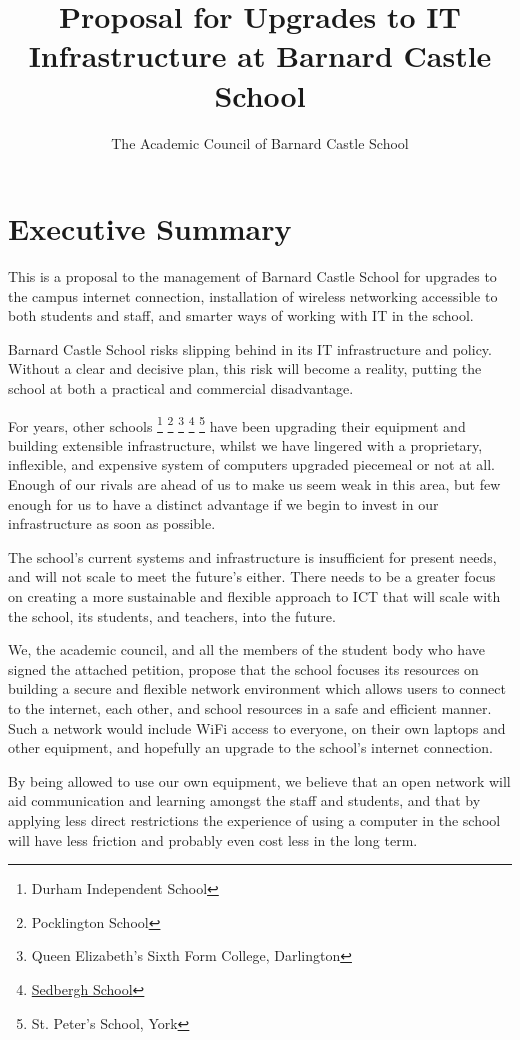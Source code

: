 \documentclass[a4paper,leqno,titlepage]{article}
\title{Proposal for Upgrades to IT Infrastructure at Barnard Castle School}
\author{The Academic Council of Barnard Castle School}
\begin{document}
\maketitle

\section{Executive Summary}

This is a proposal to the management of Barnard Castle School for upgrades
to the campus internet connection,
installation of wireless networking accessible to both students and staff,
and smarter ways of working with IT in the school. 

Barnard Castle School risks slipping behind in its
IT infrastructure and policy.
Without a clear and decisive plan, this risk will become a reality, putting
the school at both a practical and commercial disadvantage.


For years, other schools
\footnote{Durham Independent School}
\footnote{Pocklington School}
\footnote{Queen Elizabeth's Sixth Form College, Darlington}
\footnote{\href{http://www.sedberghschool.org/ict.html}{Sedbergh School}}
\footnote{St. Peter's School, York}
have been upgrading their equipment and building extensible infrastructure,
whilst we have lingered with a proprietary, inflexible, and expensive system of
computers upgraded piecemeal or not at all. Enough of our rivals are ahead of
us to make us seem weak in this area, but few enough for us to have a distinct
advantage if we begin to invest in our infrastructure as soon as possible.


The school's current systems and infrastructure is insufficient for present
needs, and will not scale to meet the future's either.
There needs to be a greater focus on creating a more sustainable and flexible
approach to ICT that will scale with the school, its students, and teachers,
into the future.


We, the academic council, and all the members of the student body who have signed
the attached petition, propose that the school focuses its resources on building
a secure and flexible network environment which allows users to connect to the
internet, each other, and school resources in a safe and efficient manner.
Such a network would include WiFi access to everyone, on their own laptops and
other equipment, and hopefully an upgrade to the school's internet connection.


By being allowed to use our own equipment, we believe that an open network will
aid communication and learning amongst the staff and students, and that by
applying less direct restrictions the experience of using a computer in the
school will have less friction and probably even cost less in the long term.
\end{document}
